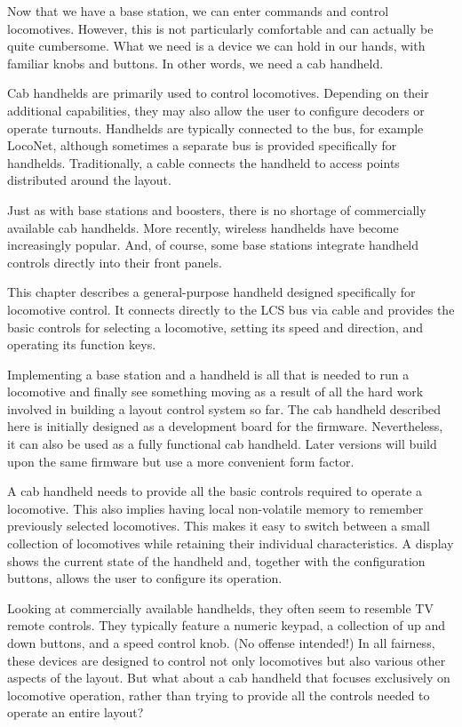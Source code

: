 
Now that we have a base station, we can enter commands and control locomotives. However, this is not particularly comfortable and can actually be quite cumbersome. What we need is a device we can hold in our hands, with familiar knobs and buttons. In other words, we need a cab handheld.

Cab handhelds are primarily used to control locomotives. Depending on their additional capabilities, they may also allow the user to configure decoders or operate turnouts. Handhelds are typically connected to the bus, for example LocoNet, although sometimes a separate bus is provided specifically for handhelds. Traditionally, a cable connects the handheld to access points distributed around the layout.

Just as with base stations and boosters, there is no shortage of commercially available cab handhelds. More recently, wireless handhelds have become increasingly popular. And, of course, some base stations integrate handheld controls directly into their front panels.

This chapter describes a general-purpose handheld designed specifically for locomotive control. It connects directly to the LCS bus via cable and provides the basic controls for selecting a locomotive, setting its speed and direction, and operating its function keys.

Implementing a base station and a handheld is all that is needed to run a locomotive and finally see something moving as a result of all the hard work involved in building a layout control system so far.
The cab handheld described here is initially designed as a development board for the firmware. Nevertheless, it can also be used as a fully functional cab handheld. Later versions will build upon the same firmware but use a more convenient form factor.


A cab handheld needs to provide all the basic controls required to operate a locomotive. This also implies having local non-volatile memory to remember previously selected locomotives. This makes it easy to switch between a small collection of locomotives while retaining their individual characteristics.
A display shows the current state of the handheld and, together with the configuration buttons, allows the user to configure its operation.

Looking at commercially available handhelds, they often seem to resemble TV remote controls. They typically feature a numeric keypad, a collection of up and down buttons, and a speed control knob. (No offense intended!) In all fairness, these devices are designed to control not only locomotives but also various other aspects of the layout.
But what about a cab handheld that focuses exclusively on locomotive operation, rather than trying to provide all the controls needed to operate an entire layout?

